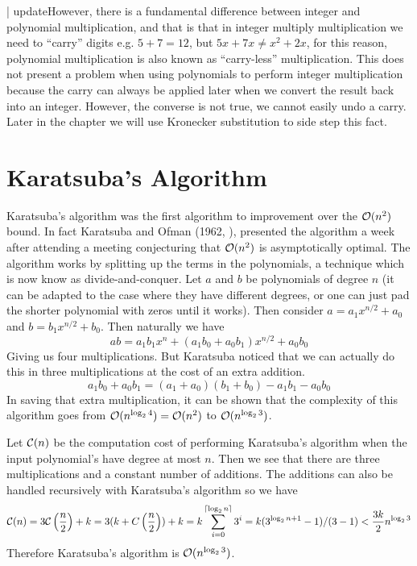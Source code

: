  | updateHowever, there is a fundamental difference between integer and polynomial multiplication, and that is that in integer multiply multiplication we need to ``carry'' digits e.g. $5 + 7 = 12$, but $5x + 7x \neq x^2 + 2x$, for this reason, polynomial multiplication is also known as ``carry-less'' multiplication. This does not present a problem when using polynomials to perform integer multiplication because the carry can always be applied later when we convert the result back into an integer. However, the converse is not true, we cannot easily undo a carry. Later in the chapter we will use Kronecker substitution to side step this fact.

\section{Karatsuba's Algorithm}
\label{sec:prelim-karatsuba}

Karatsuba's algorithm was the first algorithm to improvement over the $\mathcal O(n^2)$ bound. In fact Karatsuba and Ofman (1962, \cite{karatsuba}), presented the algorithm a week after attending a meeting conjecturing that $\mathcal O(n^2)$ is asymptotically optimal. The algorithm works by splitting up the terms in the polynomials, a technique which is now know as divide-and-conquer. Let $a$ and $b$ be polynomials of degree $n$ (it can be adapted to the case where they have different degrees, or one can just pad the shorter polynomial with zeros until it works). Then consider $a = a_1x^{n/2} + a_0$ and $b = b_1x^{n/2} + b_0$. Then naturally we have
\[
    ab = a_1b_1x^n + (a_1b_0 + a_0b_1)x^{n/2} + a_0b_0
\]
Giving us four multiplications. But Karatsuba noticed that we can actually do this in three multiplications at the cost of an extra addition.
\[
    a_1b_0 + a_0b_1 = (a_1 + a_0)(b_1 + b_0) - a_1b_1 - a_0b_0
\]
In saving that extra multiplication, it can be shown that the complexity of this algorithm goes from $\mathcal O(n^{\log_2 4}) = \mathcal O(n^2)$ to $\mathcal O(n^{\log_2 3})$.

Let $\mathcal C(n)$ be the computation cost of performing Karatsuba's algorithm when the input polynomial's have degree at most $n$. Then we see that there are three multiplications and a constant number of additions. The additions can also be handled recursively with Karatsuba's algorithm so we have
\[
    \mathcal C(n) = 3\mathcal C\left(\frac{n}{2}\right) + k = 3(k + C\left(\frac{n}{2}\right)) + k = k\sum^{\lceil \log_2 n\rceil}_{i=0} 3^i = k(3^{\log_2 n + 1} - 1)/(3 - 1) < \frac{3k}{2}n^{\log_2 3}
\]
Therefore Karatsuba's algorithm is $\mathcal O(n^{\log_2 3})$.

